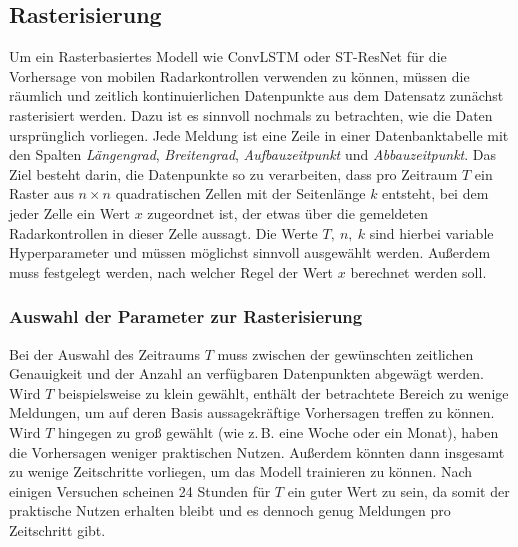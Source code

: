 \subsection{Rasterisierung}
\label{sec:Rasterisierung}
Um ein Rasterbasiertes Modell wie ConvLSTM oder ST-ResNet für die Vorhersage von mobilen Radarkontrollen verwenden zu können, müssen die räumlich und zeitlich kontinuierlichen Datenpunkte aus dem Datensatz zunächst rasterisiert werden.
Dazu ist es sinnvoll nochmals zu betrachten, wie die Daten ursprünglich vorliegen.
Jede Meldung ist eine Zeile in einer Datenbanktabelle mit den Spalten \emph{Längengrad}, \emph{Breitengrad}, \emph{Aufbauzeitpunkt} und \emph{Abbauzeitpunkt}.
Das Ziel besteht darin, die Datenpunkte so zu verarbeiten, dass pro Zeitraum $T$ ein Raster aus $n \times n$ quadratischen Zellen mit der Seitenlänge $k$ entsteht, bei dem jeder Zelle ein Wert $x$ zugeordnet ist, der etwas über die gemeldeten Radarkontrollen in dieser Zelle aussagt.
Die Werte $T,~n,~k$ sind hierbei variable Hyperparameter und müssen möglichst sinnvoll ausgewählt werden.
Außerdem muss festgelegt werden, nach welcher Regel der Wert $x$ berechnet werden soll.

\subsubsection{Auswahl der Parameter zur Rasterisierung}
\label{sec:RasterisierungParameter}
Bei der Auswahl des Zeitraums $T$ muss zwischen der gewünschten zeitlichen Genauigkeit und der Anzahl an verfügbaren Datenpunkten abgewägt werden.
Wird $T$ beispielsweise zu klein gewählt, enthält der betrachtete Bereich zu wenige Meldungen, um auf deren Basis aussagekräftige Vorhersagen treffen zu können.
Wird $T$ hingegen zu groß gewählt (wie z.\,B. eine Woche oder ein Monat), haben die Vorhersagen weniger praktischen Nutzen.
Außerdem könnten dann insgesamt zu wenige Zeitschritte vorliegen, um das Modell trainieren zu können.
Nach einigen Versuchen scheinen 24 Stunden für $T$ ein guter Wert zu sein, da somit der praktische Nutzen erhalten bleibt und es dennoch genug Meldungen pro Zeitschritt gibt.

